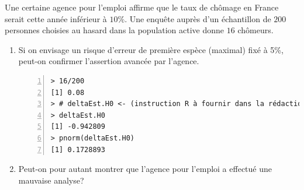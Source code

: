\documentclass[10pt]{report}
\begin{document}
\bigskip

\begin{exercice}
Une certaine agence pour l'emploi affirme que le taux de
chômage en France serait cette année inférieur à $10\%$. Une
enquête auprès d'un échantillon de $200$ personnes choisies au hasard
dans la population active donne $16$ chômeurs.
\begin{enumerate}
\item Si on envisage un risque d'erreur de première 
espèce 
(maximal) 
fixé à 5\%, peut-on confirmer l'assertion avancée par l'agence.\\
\IndicR
\begin{Verbatim}[frame=leftline,fontfamily=tt,fontshape=n,numbers=left]
> 16/200
[1] 0.08
> # deltaEst.H0 <- (instruction R à fournir dans la rédaction)
> deltaEst.H0
[1] -0.942809
> pnorm(deltaEst.H0)
[1] 0.1728893
\end{Verbatim}

\item Peut-on pour autant montrer que l'agence pour 
l'emploi a effectué une mauvaise analyse?
 

\end{enumerate}
\end{exercice}
\end{document}
